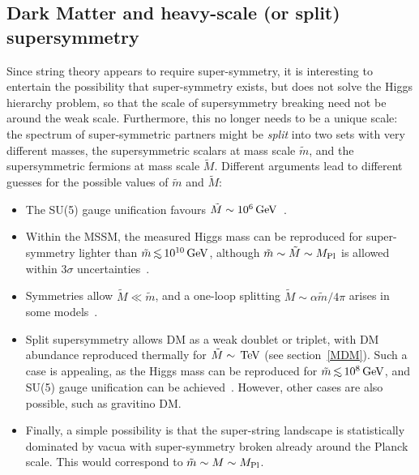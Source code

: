 \subsection{Dark Matter and heavy-scale (or split) supersymmetry}
Since string theory appears to require super-symmetry, it is interesting to entertain the possibility that 
super-symmetry exists, but does not solve the Higgs hierarchy problem, so that 
the scale of supersymmetry breaking need not  be around the weak scale.
Furthermore, this no longer needs  to be a unique scale: the spectrum of super-symmetric partners might be {\em split} into 
two sets with very different masses,  the supersymmetric scalars at mass scale $\tilde{m}$, and  
the supersymmetric fermions at mass scale $\tilde{M}$.
Different arguments lead to different guesses for the possible values of $\tilde m$ and $\tilde M$:
\begin{itemize}

\item[$\circ$] The SU(5) gauge unification favours $\tilde{M}\sim 10^6\,{\rm GeV}$~\cite{HeavySUSY}.

\item[$\circ$] Within the MSSM, the measured Higgs mass can be reproduced for super-symmetry lighter than $\tilde{m}\circa{<} 10^{10}\GeV$,
although $\tilde{m}\sim\tilde{M}\sim M_{\rm Pl}$ is allowed within $3\sigma$ uncertainties~\cite{HeavySUSY}.

\item[$\circ$] Symmetries allow $\tilde{M}\ll \tilde{m}$, and a one-loop splitting $\tilde{M} \sim \alpha \tilde{m}/4\pi$ arises in some models~\cite{HeavySUSY}.

\item[$\circ$] Split supersymmetry allows DM as a weak doublet or triplet,
with DM abundance reproduced thermally for $\tilde{M}\sim \,{\rm TeV}$ (see section~\ref{MDM}).
Such a case is appealing, as the Higgs mass can be reproduced for $\tilde{m}\circa{<}10^8\GeV$,
and SU(5) gauge unification can be achieved~\cite{HeavySUSY}.
However, other cases are also possible, such as gravitino DM.

\item[$\circ$] Finally, a simple possibility is that the super-string landscape is statistically dominated by vacua with super-symmetry broken already around the Planck scale.
This would correspond to $\tilde{m}\sim M\sim M_{\rm Pl}$.  
\end{itemize}



